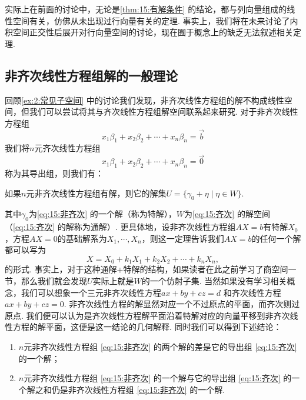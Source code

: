 实际上在前面的讨论中，无论是\autoref{thm:15:有解条件} 的结论，都与列向量组成的线性空间有关，仿佛从未出现过行向量有关的定理. 事实上，我们将在未来讨论了内积空间正交性后展开对行向量空间的讨论，现在囿于概念上的缺乏无法叙述相关定理.

\subsection{非齐次线性方程组解的一般理论}

回顾\autoref{ex:2:常见子空间} 中的讨论我们发现，非齐次线性方程组的解不构成线性空间，但我们可以尝试将其与齐次线性方程组解空间联系起来研究. 对于非齐次线性方程组
\begin{equation} \label{eq:15:非齐次}
    x_1\beta_1+x_2\beta_2+\cdots+x_n\beta_n=\vec{b}
\end{equation}
我们将$n$元齐次线性方程组
\begin{equation} \label{eq:15:齐次}
    x_1\beta_1+x_2\beta_2+\cdots+x_n\beta_n=\vec{0}
\end{equation}
称为其导出组，则我们有：
\begin{theorem}\label{thm:15:通解加特解}
    如果$n$元非齐次线性方程组有解，则它的解集$U=\{\gamma_0+\eta \mid \eta \in W\}$.
\end{theorem}
其中$\gamma_0$为\autoref{eq:15:非齐次} 的一个解（称为特解），$W$为\autoref{eq:15:齐次} 的解空间（\autoref*{eq:15:齐次} 的解称为通解）. 更具体地，设非齐次线性方程组$AX=b$有特解$X_0$，方程$AX=0$的基础解系为$X_1,\cdots,X_n$，则这一定理告诉我们$AX=b$的任何一个解都可以写为
\[X=X_0+k_1X_1+k_2X_2+\cdots+k_nX_n,\]
的形式. 事实上，对于这种通解+特解的结构，如果读者在此之前学习了商空间一节，那么我们就会发现$U$实际上就是$W$的一个仿射子集. 当然如果没有学习相关概念，我们可以想象一个三元非齐次线性方程$ax + by + cz = d$ 和齐次线性方程$ax + by + cz = 0$. 非齐次线性方程的解显然对应一个不过原点的平面，而齐次则过原点. 我们便可以认为是齐次线性方程解平面沿着特解对应的向量平移到非齐次线性方程的解平面，这便是这一结论的几何解释. 同时我们可以得到下述结论：
\begin{enumerate}
    \item $n$元非齐次线性方程组 \ref*{eq:15:非齐次} 的两个解的差是它的导出组 \ref*{eq:15:齐次} 的一个解；

    \item $n$元非齐次线性方程组 \ref*{eq:15:非齐次} 的一个解与它的导出组 \ref*{eq:15:齐次} 的一个解之和仍是非齐次线性方程组 \ref*{eq:15:非齐次} 的一个解.
\end{enumerate}


